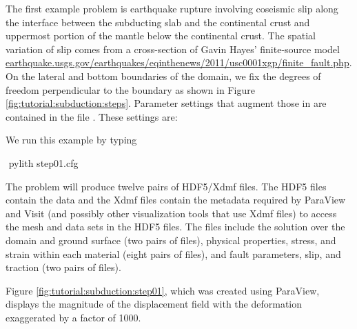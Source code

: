 The first example problem is earthquake rupture involving coseismic
slip along the interface between the subducting slab and the continental
crust and uppermost portion of the mantle below the continental crust.
The spatial variation of slip comes from a cross-section of Gavin
Hayes' finite-source model \url{earthquake.usgs.gov/earthquakes/eqinthenews/2011/usc0001xgp/finite_fault.php}.
On the lateral and bottom boundaries of the domain, we fix the degrees
of freedom perpendicular to the boundary as shown in Figure \vref{fig:tutorial:subduction:steps}.
Parameter settings that augment those in  are
contained in the file . These settings are:
\begin{inventory}
\end{inventory}
We run this example by typing
\begin{shell}
$$ pylith step01.cfg
\end{shell}
The problem will produce twelve pairs of HDF5/Xdmf files. The HDF5
files contain the data and the Xdmf files contain the metadata required
by ParaView and Visit (and possibly other visualization tools that
use Xdmf files) to access the mesh and data sets in the HDF5 files.
The files include the solution over the domain and ground surface
(two pairs of files), physical properties, stress, and strain within
each material (eight pairs of files), and fault parameters, slip,
and traction (two pairs of files). 

Figure \vref{fig:tutorial:subduction:step01}, which was created using
ParaView, displays the magnitude of the displacement field with the
deformation exaggerated by a factor of 1000. 

